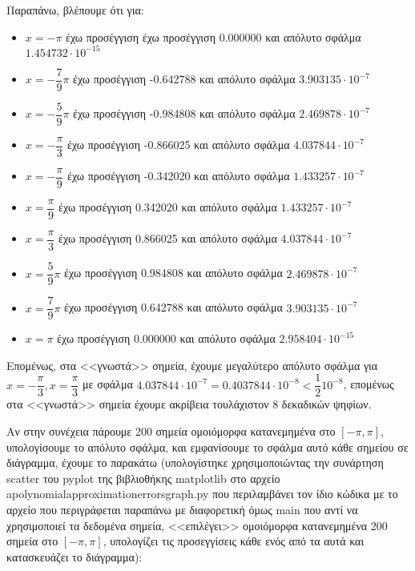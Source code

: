 \documentclass[a4paper,11pt]{article}
\newcommand{\lt}{\latintext}
\begin{document}
Παραπάνω, βλέπουμε ότι για:
\begin{itemize}
    \item {\lt $x = -\pi$} έχω προσέγγιση έχω προσέγγιση 0.000000 και απόλυτο σφάλμα $1.454732 \cdot 10^{-15}$
    \item {\lt $x = -\dfrac{7}{9}\pi$} έχω προσέγγιση -0.642788 και απόλυτο σφάλμα $3.903135\cdot 10^{-7}$
    \item {\lt $x = -\dfrac{5}{9}\pi$} έχω προσέγγιση -0.984808 και απόλυτο σφάλμα $2.469878\cdot 10^{-7}$
    \item {\lt $x = -\dfrac{\pi}{3}$} έχω προσέγγιση -0.866025 και απόλυτο σφάλμα $4.037844\cdot 10^{-7}$
    \item {\lt $x = -\dfrac{\pi}{9}$} έχω προσέγγιση -0.342020 και απόλυτο σφάλμα $1.433257\cdot 10^{-7}$
    \item {\lt $x = \dfrac{\pi}{9}$} έχω προσέγγιση 0.342020 και απόλυτο σφάλμα $1.433257\cdot 10^{-7}$
    \item {\lt $x = \dfrac{\pi}{3}$} έχω προσέγγιση 0.866025 και απόλυτο σφάλμα $4.037844\cdot 10^{-7}$
    \item {\lt $x = \dfrac{5}{9}\pi$} έχω προσέγγιση 0.984808 και απόλυτο σφάλμα $2.469878\cdot 10^{-7}$
    \item {\lt $x = \dfrac{7}{9}\pi$} έχω προσέγγιση 0.642788 και απόλυτο σφάλμα $3.903135\cdot 10^{-7}$
    \item {\lt $x = \pi$} έχω προσέγγιση 0.000000 και απόλυτο σφάλμα $2.958404\cdot 10^{-15}$
\end{itemize}

Επομένως, στα <<γνωστά>> σημεία, έχουμε μεγαλύτερο απόλυτο σφάλμα για {\lt $x = -\dfrac{\pi}{3}, x = \dfrac{\pi}{3}$}  με σφάλμα $4.037844\cdot 10^{-7} = 0.4037844\cdot 10^{-8}  < \dfrac{1}{2}10^{-8}$, επομένως στα <<γνωστά>> σημεία έχουμε ακρίβεια τουλάχιστον 8 δεκαδικών ψηφίων.

\par
Αν στην συνέχεια πάρουμε 200 σημεία ομοιόμορφα κατανεμημένα στο $[-\pi, \pi]$, υπολογίσουμε το απόλυτο σφάλμα, και εμφανίσουμε το σφάλμα αυτό κάθε σημείου σε διάγραμμα, έχουμε το παρακάτω (υπολογίστηκε χρησιμοποιώντας την συνάρτηση {\lt scatter} του {\lt pyplot} της βιβλιοθήκης {\lt matplotlib} στο αρχείο {\lt a\textunderscore polynomial\textunderscore approximation\textunderscore errors\textunderscore graph.py} που περιλαμβάνει τον ίδιο κώδικα με το αρχείο που περιγράφεται παραπάνω με διαφορετική όμως {\lt main} που αντί να χρησιμοποιεί τα δεδομένα σημεία, <<επιλέγει>> ομοιόμορφα κατανεμημένα 200 σημεία στο $[-\pi, \pi]$, υπολογίζει τις προσεγγίσεις κάθε ενός από τα αυτά και κατασκευάζει το διάγραμμα):\\
\end{document}
